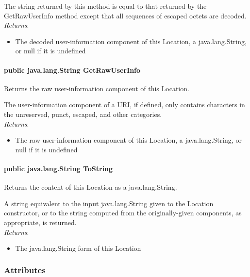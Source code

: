 \documentclass[$Date: 2003/06/26 19:29:31 $]{glabarticle}
\begin{document}
 The string returned by this method is equal to that returned by the
 GetRawUserInfo method except that all sequences of escaped octets are
 decoded.\\
 
 \textit{Returns}:
 \begin{itemize}
 \item[] The decoded user-information component of this Location, a java.lang.String, or null if it is undefined
 \end{itemize} 
  
\paragraph{public java.lang.String GetRawUserInfo}

Returns the raw user-information component of this Location.

The user-information component of a URI, if defined, only contains
characters in the unreserved, punct, escaped, and other categories.\\
 
 \textit{Returns}:
 \begin{itemize}
 \item[] The raw user-information component of this Location, a java.lang.String, or null if it is undefined
 \end{itemize}
 
 \paragraph{public java.lang.String ToString}
 
 Returns the content of this Location as a java.lang.String.

 A string equivalent to the input java.lang.String given to the Location
 constructor, or to the string computed from the originally-given
 components, as appropriate, is returned.\\
 
 \textit{Returns}:
 \begin{itemize}
 \item[] The java.lang.String form of this Location
 \end{itemize} 
 
\subsubsection{Attributes}
\end{document}
